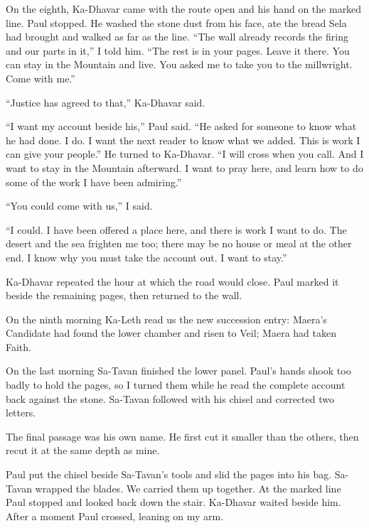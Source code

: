 On the eighth, Ka-Dhavar came with the route open and his hand on the marked line. Paul stopped. He washed the stone dust from his face, ate the bread Sela had brought and walked as far as the line. ``The wall already records the firing and our parts in it,'' I told him. ``The rest is in your pages. Leave it there. You can stay in the Mountain and live. You asked me to take you to the millwright. Come with me.''\par

``Justice has agreed to that,'' Ka-Dhavar said.\par

``I want my account beside his,'' Paul said. ``He asked for someone to know what he had done. I do. I want the next reader to know what we added. This is work I can give your people.'' He turned to Ka-Dhavar. ``I will cross when you call. And I want to stay in the Mountain afterward. I want to pray here, and learn how to do some of the work I have been admiring.''\par

``You could come with us,'' I said.\par

``I could. I have been offered a place here, and there is work I want to do. The desert and the sea frighten me too; there may be no house or meal at the other end. I know why you must take the account out. I want to stay.''\par

Ka-Dhavar repeated the hour at which the road would close. Paul marked it beside the remaining pages, then returned to the wall.\par

On the ninth morning Ka-Leth read us the new succession entry: Maera's Candidate had found the lower chamber and risen to Veil; Maera had taken Faith.\par

On the last morning Sa-Tavan finished the lower panel. Paul's hands shook too badly to hold the pages, so I turned them while he read the complete account back against the stone. Sa-Tavan followed with his chisel and corrected two letters.\par

The final passage was his own name. He first cut it smaller than the others, then recut it at the same depth as mine.\par

Paul put the chisel beside Sa-Tavan's tools and slid the pages into his bag. Sa-Tavan wrapped the blades. We carried them up together. At the marked line Paul stopped and looked back down the stair. Ka-Dhavar waited beside him. After a moment Paul crossed, leaning on my arm.\par


